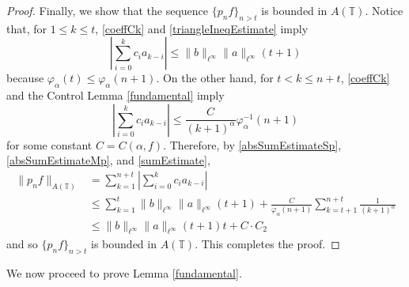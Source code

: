 \documentclass[11 pt,reqno]{amsart}
\theoremstyle{definition}
\theoremstyle{remark}
\numberwithin{equation}{section} \numberwithin{figure}{section}
\newcommand{\TT}{{\mathbb T}}
\begin{document}
\begin{proof}
            Finally, we show that the sequence $\{p_{n} f\}_{n>t}$ is bounded in $A(\TT)$.
            Notice that, for $1\leq k\leq t$, \eqref{coeffCk} and \eqref{triangleIneqEstimate}
            imply
            \begin{equation}\label{absSumEstimateSp}
                        \left|\sum_{i=0}^{k}c_{i}a_{k-i}\right|
                        \leq\|b\|_{\ell^{\infty}}\|a\|_{\ell^{\infty}}(t+1)
            \end{equation}
            because $\varphi_{\alpha}(t)\leq\varphi_{\alpha}(n+1)$.  On the other hand,
            for $t<k\leq n+t$, \eqref{coeffCk} and the Control Lemma \ref{fundamental} imply
            \begin{equation}\label{absSumEstimateMp}
                        \left|\sum_{i=0}^{k}c_{i}a_{k-i}\right|
                        \leq\frac{C}{(k+1)^{\alpha}}\varphi_{\alpha}^{-1}(n+1)
            \end{equation}
            for some constant $C=C(\alpha,f)$.  Therefore, by \eqref{absSumEstimateSp},
            \eqref{absSumEstimateMp}, and \eqref{sumEstimate},
            \begin{align*}
                        \|p_{n}f\|_{A(\TT)}&=\sum_{k=1}^{n+t}\left|\sum_{i=0}^{k}c_{i}a_{k-i}\right|\\
                        &\leq\sum_{k=1}^{t}\|b\|_{\ell^{\infty}}\|a\|_{\ell^{\infty}}(t+1)
                        +\frac{C}{\varphi_{\alpha}(n+1)}\sum_{k=t+1}^{n+t}\frac{1}{(k+1)^{\alpha}}\\
                        &\leq\|b\|_{\ell^{\infty}}\|a\|_{\ell^{\infty}}(t+1)t
                        +C\cdot C_{2}
            \end{align*}
            and so $\{p_{n} f\}_{n>t}$ is bounded in $A(\TT)$.  This completes the proof.
\end{proof}

We now proceed to prove Lemma \ref{fundamental}.
\end{document}
